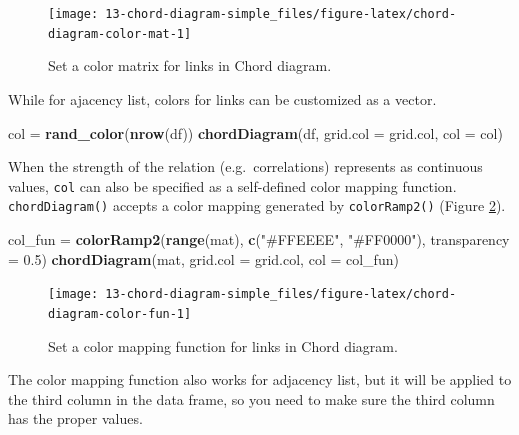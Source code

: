 \documentclass[]{book}
\newenvironment{Shaded}{\begin{snugshade}}{\end{snugshade}}
\newcommand{\KeywordTok}[1]{\textcolor[rgb]{0.13,0.29,0.53}{\textbf{#1}}}
\newcommand{\DataTypeTok}[1]{\textcolor[rgb]{0.13,0.29,0.53}{#1}}
\newcommand{\FloatTok}[1]{\textcolor[rgb]{0.00,0.00,0.81}{#1}}
\newcommand{\StringTok}[1]{\textcolor[rgb]{0.31,0.60,0.02}{#1}}
\newcommand{\NormalTok}[1]{#1}
\theoremstyle{definition}
\theoremstyle{definition}
\theoremstyle{remark}
\begin{document}
\begin{figure}

{\centering \texttt{[image: 13-chord-diagram-simple\_files/figure-latex/chord-diagram-color-mat-1]} 

}

\caption{Set a color matrix for links in Chord diagram.}\label{fig:chord-diagram-color-mat}
\end{figure}

While for ajacency list, colors for links can be customized as a vector.

\begin{Shaded}
\begin{Highlighting}[]
\NormalTok{col =}\StringTok{ }\KeywordTok{rand_color}\NormalTok{(}\KeywordTok{nrow}\NormalTok{(df))}
\KeywordTok{chordDiagram}\NormalTok{(df, }\DataTypeTok{grid.col =}\NormalTok{ grid.col, }\DataTypeTok{col =}\NormalTok{ col)}
\end{Highlighting}
\end{Shaded}

When the strength of the relation (e.g.~correlations) represents as
continuous values, \texttt{col} can also be specified as a self-defined
color mapping function. \texttt{chordDiagram()} accepts a color mapping
generated by \texttt{colorRamp2()} (Figure
\ref{fig:chord-diagram-color-fun}).

\begin{Shaded}
\begin{Highlighting}[]
\NormalTok{col_fun =}\StringTok{ }\KeywordTok{colorRamp2}\NormalTok{(}\KeywordTok{range}\NormalTok{(mat), }\KeywordTok{c}\NormalTok{(}\StringTok{"#FFEEEE"}\NormalTok{, }\StringTok{"#FF0000"}\NormalTok{), }\DataTypeTok{transparency =} \FloatTok{0.5}\NormalTok{)}
\KeywordTok{chordDiagram}\NormalTok{(mat, }\DataTypeTok{grid.col =}\NormalTok{ grid.col, }\DataTypeTok{col =}\NormalTok{ col_fun)}
\end{Highlighting}
\end{Shaded}

\begin{figure}

{\centering \texttt{[image: 13-chord-diagram-simple\_files/figure-latex/chord-diagram-color-fun-1]} 

}

\caption{Set a color mapping function for links in Chord diagram.}\label{fig:chord-diagram-color-fun}
\end{figure}

The color mapping function also works for adjacency list, but it will be
applied to the third column in the data frame, so you need to make sure
the third column has the proper values.
\end{document}
